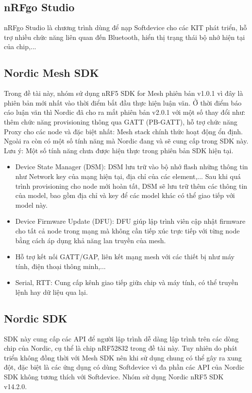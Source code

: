         \subsection{nRFgo Studio}
        nRFgo Studio là chương trình dùng để nạp Softdevice cho các KIT phát triển, hỗ trợ nhiều chức năng liên quan đến Bluetooth, hiển thị trạng thái bộ nhớ hiện tại của chip,... 
        \subsection{Nordic Mesh SDK}
        Trong đề tài này, nhóm sử dụng nRF5 SDK for Mesh phiên bản v1.0.1 vì đây là phiên bản mới nhất vào thời điểm bắt đầu thực hiện luận văn. Ở thời điểm báo cáo luận văn thì Nordic đã cho ra mắt phiên bản v2.0.1 với một số thay đổi như: thêm chức năng provisioning thông qua GATT (PB-GATT), hỗ trợ chức năng Proxy cho các node và đặc biệt nhất: Mesh stack chính thức hoạt động ổn định. \\
        
        Ngoài ra còn có một số tính năng mà Nordic đang và sẽ cung cấp trong SDK này. Lưu ý: Một số tính năng chưa được hiện thực trong phiên bản SDK hiện tại.
            \begin{itemize}
                \item Device State Manager (DSM): DSM lưu trữ vào bộ nhớ flash những thông tin như Network key của mạng hiện tại, địa chỉ của các element,... Sau khi quá trình provisioning cho node mới hoàn tất, DSM sẽ lưu trữ thêm các thông tin của model, bao gồm địa chỉ và key để các model khác có thể giao tiếp với model này.
                \item Device Firmware Update (DFU): DFU giúp lập trình viên cập nhật firmware cho tất cả node trong mạng mà không cần tiếp xúc trực tiếp với từng node bằng cách áp dụng khả năng lan truyền của mesh.
                \item Hỗ trợ kết nối GATT/GAP, liên kết mạng mesh với các thiết bị như máy tính, điện thoại thông minh,...
                \item Serial, RTT: Cung cấp kênh giao tiếp giữa chip và máy tính, có thể truyền lệnh hay dữ liệu qua lại.
            \end{itemize}
            
        \subsection{Nordic SDK}
        SDK này cung cấp các API để người lập trình dễ dàng lập trình trên các dòng chip của Nordic, cụ thể là chip nRF52832 trong đề tài này. Tuy nhiên do phát triển không đồng thời với Mesh SDK nên khi sử dụng chung có thể gây ra xung đột, đặc biệt là các ứng dụng có dùng Softdevice vì đa phần các API của Nordic SDK không tương thích với Softdevice. Nhóm sử dụng Nordic nRF5 SDK v14.2.0\cite{nrf5sdk}.
